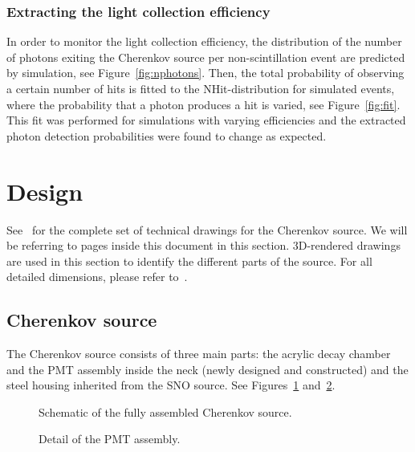 \subsubsection{Extracting the light collection efficiency}
In order to monitor the light collection efficiency, the distribution of the number of photons exiting the Cherenkov
source per non-scintillation event are predicted by simulation, see Figure~\ref{fig:nphotons}. Then, the total probability of observing a certain number of hits is fitted to the NHit-distribution for simulated events, where the probability that a photon produces a hit is varied, see Figure~\ref{fig:fit}. This fit was performed for simulations with varying efficiencies and the extracted photon detection probabilities were found to change as expected.


\section{Design}
\label{chap:design}

See~\cite{wallig:2015} for the complete set of technical drawings for the Cherenkov source. We will be referring to pages inside this document in this section. 3D-rendered drawings are used in this section to identify the different parts of the source. For all detailed dimensions, please refer to~\cite{wallig:2015}.
\subsection{Cherenkov source}
The Cherenkov source consists of three main parts: the acrylic decay chamber and the PMT assembly inside the neck (newly designed and constructed) and the steel housing inherited from the SNO \Li source. See Figures~\ref{fig:design-1} and~\ref{fig:design-2}.
\begin{figure}
\caption{\label{fig:design-1}Schematic of the fully assembled Cherenkov source.}
\end{figure}
\begin{figure}
\caption{\label{fig:design-2}Detail of the PMT assembly.}
\end{figure}

